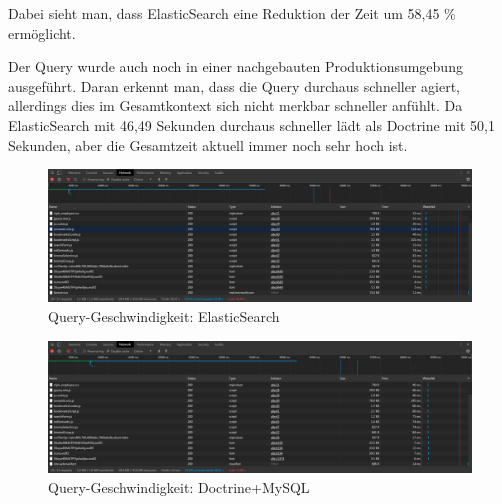 Dabei sieht man, dass ElasticSearch eine Reduktion der Zeit um 58,45 \% ermöglicht.

Der Query wurde auch noch in einer nachgebauten Produktionsumgebung ausgeführt. Daran erkennt man, dass die Query durchaus schneller agiert, allerdings dies im Gesamtkontext sich nicht merkbar schneller anfühlt. Da ElasticSearch mit 46,49 Sekunden durchaus schneller lädt als Doctrine mit 50,1 Sekunden, aber die Gesamtzeit aktuell immer noch sehr hoch ist.

\begin{figure}
	\centering
	\includegraphics[width=1\linewidth]{images/setup/query/time_prod_ela.png}
	\caption{Query-Geschwindigkeit: ElasticSearch}
	\label{img:timeProdEla}
\end{figure}

\begin{figure}
	\centering
	\includegraphics[width=1\linewidth]{images/setup/query/time_prod_db.png}
	\caption{Query-Geschwindigkeit: Doctrine+MySQL}
	\label{img:timeProdDb}
\end{figure}